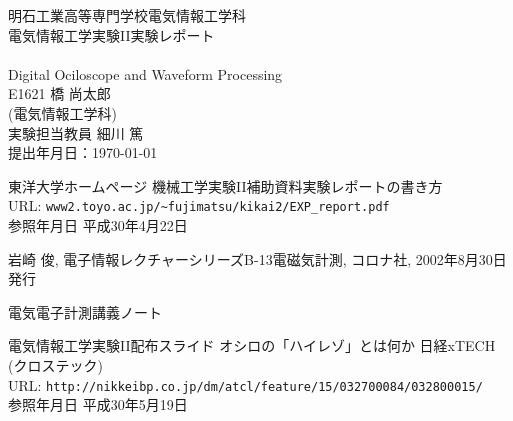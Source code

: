 \documentclass[10pt,a4j,dvipdfmx]{jarticle}
\begin{document}
\setlength{\abovedisplayskip}{1.5pt} 
\setlength{\belowdisplayskip}{0pt}

\thispagestyle{empty}
\vspace*{2cm}
\thispagestyle{empty}
\begin{spacing}{1}

\begin{center}
{\Large 明石工業高等専門学校電気情報工学科 \\[1truecm]
電気情報工学実験II実験レポート} \\[3.5truecm]
\huge {} \\
\LARGE Digital Ociloscope and Waveform Processing\\[4truecm]
\Large E1621 橋 尚太郎 \\
(電気情報工学科) \\[1truecm]
実験担当教員 細川 篤 \\
提出年月日：\today
\end{center}

\newpage
{}
\tableofcontents
\end{spacing}
\clearpage
{}
\pagestyle{fancy}
\setlength{\headheight}{5truemm}






\newpage
\pagestyle{plain}

\begin{thebibliography}{3}
\setlength{\parskip}{0cm} %
\setlength{\itemsep}{0cm}

東洋大学ホームページ 機械工学実験II補助資料実験レポートの書き方\\
URL: \verb|www2.toyo.ac.jp/~fujimatsu/kikai2/EXP_report.pdf|\\
参照年月日 平成30年4月22日

岩崎 俊, 電子情報レクチャーシリーズB-13電磁気計測, コロナ社, 2002年8月30日発行

電気電子計測講義ノート

電気情報工学実験II配布スライド
オシロの「ハイレゾ」とは何か 日経xTECH (クロステック)\\
URL: \verb|http://nikkeibp.co.jp/dm/atcl/feature/15/032700084/032800015/| \\
参照年月日 平成30年5月19日


\end{thebibliography}
\end{document}

